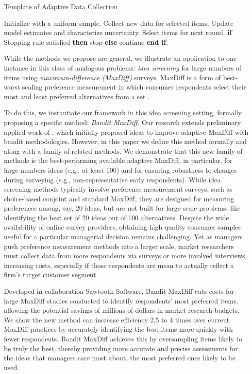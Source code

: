 \documentclass[nonblindrev]{informs3}
\begin{document}
\begin{algorithm} 
\caption{Template of Adaptive Data Collection} \label{alg:general}
\begin{algorithmic}[1]
\State Initialize with a uniform sample.
\State Collect new data for selected items.
\State Update model estimates and characterize uncertainty.
\State Select items for next round.
\State \textbf{if} {Stopping rule satisfied} \textbf{then} stop \textbf{else} continue \textbf{end if}.
\EndFor
\end{algorithmic}
\end{algorithm}

While the methods we propose are general, we illustrate an application to one instance in this class of analogous problems: \emph{idea screening} for large numbers of items using \emph{maximum-difference (MaxDiff)} surveys. MaxDiff is a form of best-worst scaling preference measurement in which consumer respondents select their most and least preferred alternatives from a set \citep{marley2005some}. 

To do this, we instantiate our framework in this idea screening setting, formally proposing a specific method: \emph{Bandit MaxDiff}. Our research extends preliminary applied work of \cite{fairchildetal2015banditmaxdiff}, which initially proposed ideas to improve adaptive MaxDiff with bandit methodologies. However, in this paper we define this method formally and along with a family of related methods. We demonstrate that this new family of methods is the best-performing available adaptive MaxDiff, in particular, for large numbers ideas (e.g., at least 100) and for ensuring robustness to changes during surveying (e.g., non-representative early respondents). While idea screening methods typically involve preference measurement surveys, such as choice-based conjoint and standard MaxDiff, they are designed for measuring preferences among, say, 20 ideas, but are not built for large-scale problems, like identifying the best set of 20 ideas out of 100 alternatives. Despite the wide availability of online survey providers, obtaining high quality consumer samples useful for a particular managerial decision remains challenging. Yet as managers push preference measurement methods into a larger scale, market researchers must collect data from more respondents via surveys or more involved interviews, increasing costs, especially if those respondents are mean to actually reflect a firm's target customer segment.

Developed in collaboration Sawtooth Software, Bandit MaxDiff cuts costs for large MaxDiff studies conducted to identify respondents’ most preferred items, allowing the potential savings of millions of dollars in market research budgets. We show the new method can increase efficiency 2.5 to 4 times over current MaxDiff practices by accurately identifying the best items more quickly with fewer respondents. Bandit MaxDiff achieves this by oversampling items likely to be truly the best, thereby providing more accurate and precise assessments for the ideas that managers care most about, the most preferred ones likely to be used. 
\end{document}
